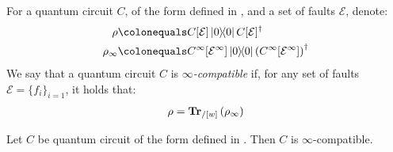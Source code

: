 \begin{definition}
  For a quantum circuit $C$, of the form defined in , and a set of faults $\mathcal{E}$, denote:
  \begin{equation*}
    \begin{split}
      \rho & \colonequals C[\mathcal{E}] \ketbra{0}{0} C[\mathcal{E}]^{\dagger} \\
      \rho_{\infty} & \colonequals C^{\infty}[\mathcal{E}^{\infty}]\ketbra{0}{0}\left(C^{\infty}[\mathcal{E}^{\infty}]\right)^{\dagger}
    \end{split}
  \end{equation*}
  We say that a quantum circuit $C$ is \textit{$\infty$-compatible} if, for any set of faults $\mathcal{E} = \{ f_{i} \}_{i=1}$, it holds that:
  \begin{equation*}
    \begin{split}
      \rho =  \mathbf{Tr}{}_{/[w]}\left( \rho_{\infty} \right) 
    \end{split}
  \end{equation*}
\end{definition}
\begin{claim}
  Let $C$ be quantum circuit of the form defined in . Then $C$ is $\infty$-compatible.
\end{claim}
